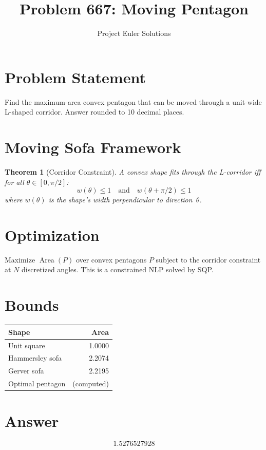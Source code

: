 \documentclass[11pt]{article}
\title{Problem 667: Moving Pentagon}
\author{Project Euler Solutions}
\date{}
\newtheorem{theorem}{Theorem}
\begin{document}
\maketitle

\section{Problem Statement}

Find the maximum-area convex pentagon that can be moved through a unit-wide L-shaped corridor. Answer rounded to 10 decimal places.

\section{Moving Sofa Framework}

\begin{theorem}[Corridor Constraint]
A convex shape fits through the L-corridor iff for all $\theta \in [0, \pi/2]$:
\[
w(\theta) \le 1 \quad \text{and} \quad w(\theta + \pi/2) \le 1
\]
where $w(\theta)$ is the shape's width perpendicular to direction~$\theta$.
\end{theorem}

\section{Optimization}

Maximize $\operatorname{Area}(P)$ over convex pentagons $P$ subject to the corridor constraint at $N$ discretized angles. This is a constrained NLP solved by SQP.

\section{Bounds}

\begin{center}
\begin{tabular}{lr}
\toprule
Shape & Area \\
\midrule
Unit square & 1.0000 \\
Hammersley sofa & 2.2074 \\
Gerver sofa & 2.2195 \\
Optimal pentagon & (computed) \\
\bottomrule
\end{tabular}
\end{center}

\section{Answer}

\[
\boxed{1.5276527928}
\]
\end{document}
